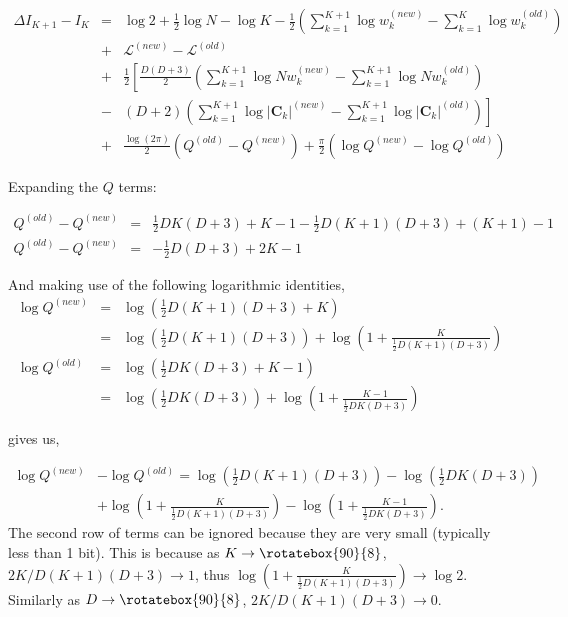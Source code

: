 \documentclass{elsarticle}
\newcommand{\vect}[1]{\boldsymbol{\mathbf{#1}}}
\def\infinity{\rotatebox{90}{8}}
\def\cov{C}
\def\veccov{\vect{\cov}}
\begin{document}
\begin{eqnarray}
\Delta{}I_{K+1} - I_K &=& \log{2} %
    + \frac{1}{2}\log{N} - \log{K} - \frac{1}{2}\left(\sum_{k=1}^{K+1}\log{w_k^{(new)}} - \sum_{k=1}^{K}\log{w_k^{(old)}}\right) \nonumber \\ %
& +& \mathcal{L}^{(new)} - \mathcal{L}^{(old)} \nonumber \\ %
& +& \frac{1}{2}\left[\frac{D(D+3)}{2}\left(\sum_{k=1}^{K+1}\log{Nw_k^{(new)} - \sum_{k=1}^{K+1}\log{Nw_k^{(old)}}} \right) \right.\nonumber\\
&-& \left.\left(D+2\right)\left(\sum_{k=1}^{K+1}\log{|\veccov_k|^{(new)}} - \sum_{k=1}^{K+1}\log{|\veccov_k|^{(old)}}\right)\right] \nonumber \\
& +& \frac{\log(2\pi)}{2}(Q^{(old)} - Q^{(new)}) + \frac{\pi}{2}\left(\log{Q^{(new)}} - \log{Q^{(old)}}\right)
\label{eq:13}
\end{eqnarray}

Expanding the $Q$ terms:

\begin{eqnarray}
Q^{(old)} - Q^{(new)} &=& \frac{1}{2}DK(D + 3) + K - 1 - \frac{1}{2}D(K + 1)(D + 3) + (K + 1) - 1 \nonumber \\
Q^{(old)} - Q^{(new)} &=& -\frac{1}{2}D(D+3) + 2K  - 1
\label{eq:14}
\end{eqnarray}

\noindent{}And making use of the following logarithmic identities,
\begin{eqnarray}
  \log{Q^{(new)}} &=& \log{\left(\frac{1}{2}D(K+1)(D + 3) + K\right)} \nonumber \\
                  &=& \log{\left(\frac{1}{2}D(K+1)(D + 3)\right)} + \log{\left(1 + \frac{K}{\frac{1}{2}D(K+1)(D + 3)}\right)} \\
  \log{Q^{(old)}} &=& \log{\left(\frac{1}{2}DK(D + 3) + K - 1\right)} \nonumber \\
                  &=& \log{\left(\frac{1}{2}DK(D + 3)\right)} + \log{\left(1 + \frac{K - 1}{\frac{1}{2}DK(D + 3)}\right)}
\end{eqnarray}


\noindent{}gives us,

\begin{eqnarray}
  \log{Q^{(new)}} &- \log{Q^{(old)}} = \log{\left(\frac{1}{2}D(K+1)(D + 3)\right)} - \log{\left(\frac{1}{2}DK(D + 3)\right)} \nonumber \\
                                    &+ \log{\left(1 + \frac{K}{\frac{1}{2}D(K+1)(D + 3)}\right)} - \log{\left(1 + \frac{K - 1}{\frac{1}{2}DK(D + 3)}\right)}.
\end{eqnarray}
The second row of terms can be ignored because they are very small (typically less than 1 bit). This is because as $K \rightarrow \infinity$, $2K/D(K+1)(D+3) \rightarrow 1$, thus $\log{\left(1 + \frac{K}{\frac{1}{2}D(K+1)(D + 3)}\right)} \rightarrow \log{2}$. Similarly as $D \rightarrow \infinity$, $2K/D(K+1)(D+3) \rightarrow 0$.
\end{document}
